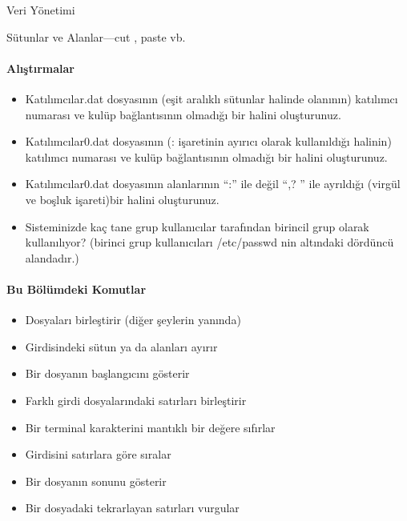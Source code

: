 \begin{section}{Veri Yönetimi}
\begin{subsection}{Sütunlar ve Alanlar—cut , paste vb.}
\paragraph{Alıştırmalar}{
\begin{itemize}
 \item Katılımcılar.dat dosyasının (eşit aralıklı sütunlar halinde olanının) katılımcı numarası ve kulüp bağlantısının olmadığı bir halini oluşturunuz.
 \item Katılımcılar0.dat dosyasının (: işaretinin ayırıcı olarak kullanıldığı halinin) katılımcı numarası ve kulüp bağlantısının olmadığı bir halini oluşturunuz.
 \item Katılımcılar0.dat dosyasının alanlarının “:” ile değil “,? ” ile ayrıldığı (virgül ve boşluk işareti)bir halini oluşturunuz.
 \item Sisteminizde kaç tane grup kullanıcılar tarafından birincil grup olarak kullanılıyor? (birinci grup kullanıcıları /etc/passwd nin altındaki dördüncü alandadır.)
\end{itemize}}

\paragraph{Bu Bölümdeki Komutlar}{
\begin{itemize}
\item[cat]Dosyaları birleştirir (diğer şeylerin yanında)
\item[cut]Girdisindeki sütun ya da alanları ayırır
\item[head]Bir dosyanın başlangıcını gösterir
\item[paste]Farklı girdi dosyalarındaki satırları birleştirir
\item[reset]Bir terminal karakterini mantıklı bir değere sıfırlar
\item[sort]Girdisini satırlara göre sıralar
\item[tail]Bir dosyanın sonunu gösterir
\item[uniq]Bir dosyadaki tekrarlayan satırları vurgular
\end{itemize}}


\end{subsection}
\end{section}
